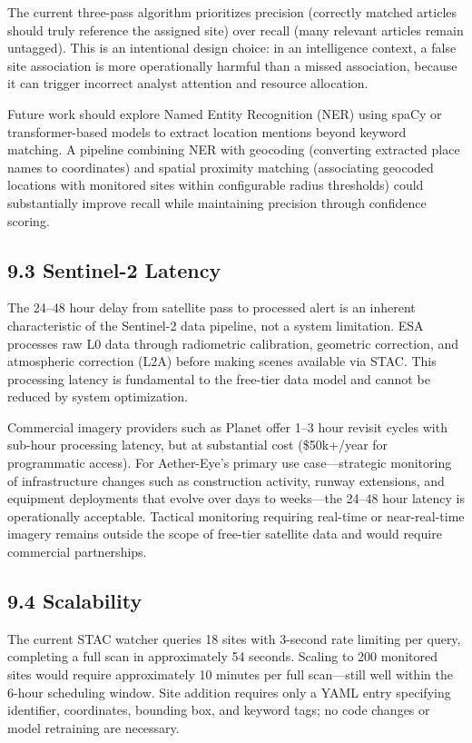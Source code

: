 \documentclass[11pt,a4paper]{article}
\begin{document}
The current three-pass algorithm prioritizes precision (correctly matched articles should truly reference the assigned site) over recall (many relevant articles remain untagged). This is an intentional design choice: in an intelligence context, a false site association is more operationally harmful than a missed association, because it can trigger incorrect analyst attention and resource allocation.

Future work should explore Named Entity Recognition (NER) using spaCy or transformer-based models to extract location mentions beyond keyword matching. A pipeline combining NER with geocoding (converting extracted place names to coordinates) and spatial proximity matching (associating geocoded locations with monitored sites within configurable radius thresholds) could substantially improve recall while maintaining precision through confidence scoring.

\hypertarget{sentinel-2-latency}{%
\subsection{9.3 Sentinel-2 Latency}\label{sentinel-2-latency}}

The 24--48 hour delay from satellite pass to processed alert is an inherent characteristic of the Sentinel-2 data pipeline, not a system limitation. ESA processes raw L0 data through radiometric calibration, geometric correction, and atmospheric correction (L2A) before making scenes available via STAC. This processing latency is fundamental to the free-tier data model and cannot be reduced by system optimization.

Commercial imagery providers such as Planet offer 1--3 hour revisit cycles with sub-hour processing latency, but at substantial cost (\$50k+/year for programmatic access). For Aether-Eye's primary use case---strategic monitoring of infrastructure changes such as construction activity, runway extensions, and equipment deployments that evolve over days to weeks---the 24--48 hour latency is operationally acceptable. Tactical monitoring requiring real-time or near-real-time imagery remains outside the scope of free-tier satellite data and would require commercial partnerships.

\hypertarget{scalability}{%
\subsection{9.4 Scalability}\label{scalability}}

The current STAC watcher queries 18 sites with 3-second rate limiting per query, completing a full scan in approximately 54 seconds. Scaling to 200 monitored sites would require approximately 10 minutes per full scan---still well within the 6-hour scheduling window. Site addition requires only a YAML entry specifying identifier, coordinates, bounding box, and keyword tags; no code changes or model retraining are necessary.
\end{document}
